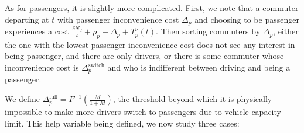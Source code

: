 \documentclass[english, a4paper]{article}
\theoremstyle{plain}
\theoremstyle{definition}
\theoremstyle{remark}
\begin{document}
As for passengers, it is slightly more complicated. First, we note that a commuter departing at $t$ with passenger inconvenience cost $\Delta _p$ and choosing to be passenger experiences a cost $\frac{\delta N_d}{s} + \rho _p + \Delta _p + T^{\nu}_p(t)$. Then sorting commuters by $\Delta _p$, either the one with the lowest passenger inconvenience cost does not see any interest in being passenger, and there are only drivers, or there is some commuter whose inconvenience cost is $\Delta _p^{\text{switch}}$ and who is indifferent between driving and being a passenger.

We define $\Delta _p^{\text{full}} = F^{-1}\left( \frac{M}{1+M} \right)$, the threshold beyond which it is physically impossible to make more drivers switch to passengers due to vehicle capacity limit. This help variable being defined, we now study three cases:
\end{document}
